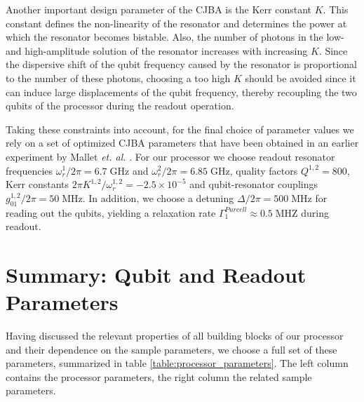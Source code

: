 \smallskip

Another important design parameter of the CJBA is the Kerr constant $K$. This constant defines the non-linearity of the resonator and determines the power at which the resonator becomes bistable. Also, the number of photons in the low- and high-amplitude solution of the resonator increases with increasing $K$. Since the dispersive shift of the qubit frequency caused by the resonator is proportional to the number of these photons, choosing a too high $K$ should be avoided since it can induce large displacements of the qubit frequency, thereby recoupling the two qubits of the processor during the readout operation. 

\smallskip

Taking these constraints into account, for the final choice of parameter values we rely on a set of optimized CJBA parameters that have been obtained in an earlier experiment by Mallet {\it et. al.} \citep{mallet_single-shot_2009}. For our processor we choose readout resonator frequencies $\omega_r^1/2\pi = 6.7 \;\mathrm{GHz}$ and $\omega_r^2/2\pi = 6.85\;\mathrm{GHz}$, quality factors $Q^{1,2}=800$, Kerr constants $2\pi K^{1,2}/\omega_r^{1,2}=-2.5\times 10^{-5}$ and qubit-resonator couplings $g_{01}^{1,2}/2\pi=50\;\mathrm{MHz}$. In addition, we choose a detuning $\Delta/2\pi = 500\;\mathrm{MHz}$ for reading out the qubits, yielding a relaxation rate $\Gamma^{Purcell}_1\approx 0.5\;\mathrm{MHZ}$ during readout.

\section{Summary: Qubit and Readout Parameters}

Having discussed the relevant properties of all building blocks of our processor and their dependence on the sample parameters, we choose a full set of these parameters, summarized in table \ref{table:processor_parameters}. The left column contains the processor parameters, the right column the related sample parameters.

